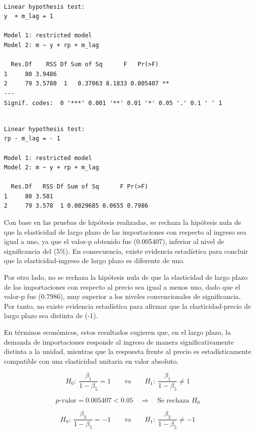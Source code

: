 \documentclass[
  11pt,
  letterpaper,
  DIV=11,
  numbers=noendperiod]{scrartcl}
\begin{document}
\begin{verbatim}

Linear hypothesis test:
y  + m_lag = 1

Model 1: restricted model
Model 2: m ~ y + rp + m_lag

  Res.Df    RSS Df Sum of Sq      F   Pr(>F)   
1     80 3.9486                                
2     79 3.5780  1   0.37063 8.1833 0.005407 **
---
Signif. codes:  0 '***' 0.001 '**' 0.01 '*' 0.05 '.' 0.1 ' ' 1
\end{verbatim}

\begin{verbatim}

Linear hypothesis test:
rp - m_lag = - 1

Model 1: restricted model
Model 2: m ~ y + rp + m_lag

  Res.Df   RSS Df Sum of Sq      F Pr(>F)
1     80 3.581                           
2     79 3.578  1 0.0029685 0.0655 0.7986
\end{verbatim}

Con base en las pruebas de hipótesis realizadas, se rechaza la hipótesis
nula de que la elasticidad de largo plazo de las importaciones con
respecto al ingreso sea igual a uno, ya que el valor-p obtenido fue
(0.005407), inferior al nivel de significancia del (5\%). En
consecuencia, existe evidencia estadística para concluir que la
elasticidad-ingreso de largo plazo es diferente de uno.

Por otro lado, no se rechaza la hipótesis nula de que la elasticidad de
largo plazo de las importaciones con respecto al precio sea igual a
menos uno, dado que el valor-p fue (0.7986), muy superior a los niveles
convencionales de significancia. Por tanto, no existe evidencia
estadística para afirmar que la elasticidad-precio de largo plazo sea
distinta de (-1).

En términos económicos, estos resultados sugieren que, en el largo
plazo, la demanda de importaciones responde al ingreso de manera
significativamente distinta a la unidad, mientras que la respuesta
frente al precio es estadísticamente compatible con una elasticidad
unitaria en valor absoluto.

\[
H_0:\ \frac{\beta_1}{1-\beta_5}=1
\qquad \text{vs} \qquad
H_1:\ \frac{\beta_1}{1-\beta_5}\neq 1
\]

\[
p\text{-valor}=0.005407<0.05
\quad \Rightarrow \quad
\text{Se rechaza } H_0
\]

\[
H_0:\ \frac{\beta_3}{1-\beta_5}=-1
\qquad \text{vs} \qquad
H_1:\ \frac{\beta_3}{1-\beta_5}\neq -1
\]
\end{document}
